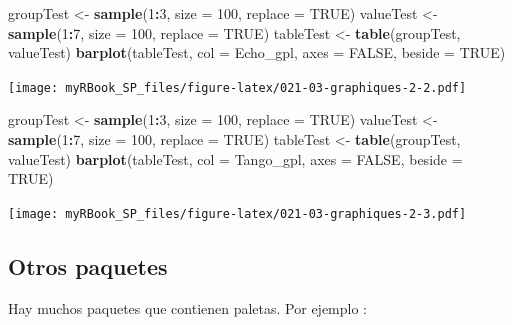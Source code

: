 \documentclass[
]{book}
\newenvironment{Shaded}{\begin{snugshade}}{\end{snugshade}}
\newcommand{\DataTypeTok}[1]{\textcolor[rgb]{0.13,0.29,0.53}{#1}}
\newcommand{\DecValTok}[1]{\textcolor[rgb]{0.00,0.00,0.81}{#1}}
\newcommand{\KeywordTok}[1]{\textcolor[rgb]{0.13,0.29,0.53}{\textbf{#1}}}
\newcommand{\NormalTok}[1]{#1}
\newcommand{\OperatorTok}[1]{\textcolor[rgb]{0.81,0.36,0.00}{\textbf{#1}}}
\newcommand{\OtherTok}[1]{\textcolor[rgb]{0.56,0.35,0.01}{#1}}
\newcommand{\StringTok}[1]{\textcolor[rgb]{0.31,0.60,0.02}{#1}}
\begin{document}
\begin{Shaded}
\begin{Highlighting}[]
\NormalTok{groupTest <-}\StringTok{ }\KeywordTok{sample}\NormalTok{(}\DecValTok{1}\OperatorTok{:}\DecValTok{3}\NormalTok{, }\DataTypeTok{size =} \DecValTok{100}\NormalTok{, }\DataTypeTok{replace =} \OtherTok{TRUE}\NormalTok{) }
\NormalTok{valueTest <-}\StringTok{ }\KeywordTok{sample}\NormalTok{(}\DecValTok{1}\OperatorTok{:}\DecValTok{7}\NormalTok{, }\DataTypeTok{size =} \DecValTok{100}\NormalTok{, }\DataTypeTok{replace =} \OtherTok{TRUE}\NormalTok{)}
\NormalTok{tableTest <-}\StringTok{ }\KeywordTok{table}\NormalTok{(groupTest, valueTest)}
\KeywordTok{barplot}\NormalTok{(tableTest, }
  \DataTypeTok{col =}\NormalTok{ Echo_gpl, }\DataTypeTok{axes =} \OtherTok{FALSE}\NormalTok{, }\DataTypeTok{beside =} \OtherTok{TRUE}\NormalTok{)}
\end{Highlighting}
\end{Shaded}

\texttt{[image: myRBook\_SP\_files/figure-latex/021-03-graphiques-2-2.pdf]}

\begin{Shaded}
\begin{Highlighting}[]
\NormalTok{groupTest <-}\StringTok{ }\KeywordTok{sample}\NormalTok{(}\DecValTok{1}\OperatorTok{:}\DecValTok{3}\NormalTok{, }\DataTypeTok{size =} \DecValTok{100}\NormalTok{, }\DataTypeTok{replace =} \OtherTok{TRUE}\NormalTok{) }
\NormalTok{valueTest <-}\StringTok{ }\KeywordTok{sample}\NormalTok{(}\DecValTok{1}\OperatorTok{:}\DecValTok{7}\NormalTok{, }\DataTypeTok{size =} \DecValTok{100}\NormalTok{, }\DataTypeTok{replace =} \OtherTok{TRUE}\NormalTok{)}
\NormalTok{tableTest <-}\StringTok{ }\KeywordTok{table}\NormalTok{(groupTest, valueTest)}
\KeywordTok{barplot}\NormalTok{(tableTest, }
  \DataTypeTok{col =}\NormalTok{ Tango_gpl, }\DataTypeTok{axes =} \OtherTok{FALSE}\NormalTok{, }\DataTypeTok{beside =} \OtherTok{TRUE}\NormalTok{)}
\end{Highlighting}
\end{Shaded}

\texttt{[image: myRBook\_SP\_files/figure-latex/021-03-graphiques-2-3.pdf]}

\hypertarget{otros-paquetes}{%
\subsection{Otros paquetes}\label{otros-paquetes}}

Hay muchos paquetes que contienen paletas. Por ejemplo :
\end{document}
